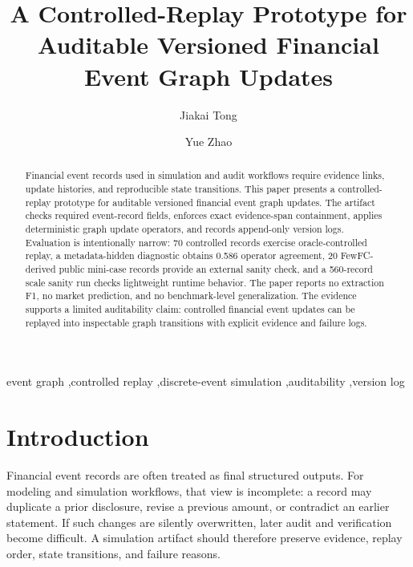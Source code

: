 \documentclass[3p,times,procedia]{elsarticle}
\begin{document}
\begin{frontmatter}


\title{A Controlled-Replay Prototype for Auditable Versioned Financial Event Graph Updates}

\author[a]{Jiakai Tong}
\author[a]{Yue Zhao}
\address[a]{School of Astronautics, Harbin Institute of Technology, Harbin, China}

\begin{abstract}
Financial event records used in simulation and audit workflows require evidence links, update histories, and reproducible state transitions. This paper presents a controlled-replay prototype for auditable versioned financial event graph updates. The artifact checks required event-record fields, enforces exact evidence-span containment, applies deterministic graph update operators, and records append-only version logs. Evaluation is intentionally narrow: 70 controlled records exercise oracle-controlled replay, a metadata-hidden diagnostic obtains 0.586 operator agreement, 20 FewFC-derived public mini-case records provide an external sanity check, and a 560-record scale sanity run checks lightweight runtime behavior. The paper reports no extraction F1, no market prediction, and no benchmark-level generalization. The evidence supports a limited auditability claim: controlled financial event updates can be replayed into inspectable graph transitions with explicit evidence and failure logs.
\end{abstract}

\begin{keyword}
event graph \sep controlled replay \sep discrete-event simulation \sep auditability \sep version log
\end{keyword}

\end{frontmatter}

\clearpage

\section{Introduction}

Financial event records are often treated as final structured outputs. For modeling and simulation workflows, that view is incomplete: a record may duplicate a prior disclosure, revise a previous amount, or contradict an earlier statement. If such changes are silently overwritten, later audit and verification become difficult. A simulation artifact should therefore preserve evidence, replay order, state transitions, and failure reasons.
\end{document}
